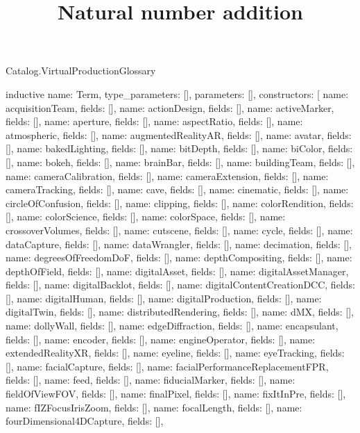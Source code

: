 \begin{lexlean}{Catalog.VirtualProductionGlossary}
\title{Natural number addition}
\begin{semanticmodule}
inductive{
  name: Term,
  type_parameters: [],
  parameters: [],
  constructors: [
    {name: acquisitionTeam, fields: []},
    {name: actionDesign, fields: []},
    {name: activeMarker, fields: []},
    {name: aperture, fields: []},
    {name: aspectRatio, fields: []},
    {name: atmospheric, fields: []},
    {name: augmentedRealityAR, fields: []},
    {name: avatar, fields: []},
    {name: bakedLighting, fields: []},
    {name: bitDepth, fields: []},
    {name: biColor, fields: []},
    {name: bokeh, fields: []},
    {name: brainBar, fields: []},
    {name: buildingTeam, fields: []},
    {name: cameraCalibration, fields: []},
    {name: cameraExtension, fields: []},
    {name: cameraTracking, fields: []},
    {name: cave, fields: []},
    {name: cinematic, fields: []},
    {name: circleOfConfusion, fields: []},
    {name: clipping, fields: []},
    {name: colorRendition, fields: []},
    {name: colorScience, fields: []},
    {name: colorSpace, fields: []},
    {name: crossoverVolumes, fields: []},
    {name: cutscene, fields: []},
    {name: cycle, fields: []},
    {name: dataCapture, fields: []},
    {name: dataWrangler, fields: []},
    {name: decimation, fields: []},
    {name: degreesOfFreedomDoF, fields: []},
    {name: depthCompositing, fields: []},
    {name: depthOfField, fields: []},
    {name: digitalAsset, fields: []},
    {name: digitalAssetManager, fields: []},
    {name: digitalBacklot, fields: []},
    {name: digitalContentCreationDCC, fields: []},
    {name: digitalHuman, fields: []},
    {name: digitalProduction, fields: []},
    {name: digitalTwin, fields: []},
    {name: distributedRendering, fields: []},
    {name: dMX, fields: []},
    {name: dollyWall, fields: []},
    {name: edgeDiffraction, fields: []},
    {name: encapsulant, fields: []},
    {name: encoder, fields: []},
    {name: engineOperator, fields: []},
    {name: extendedRealityXR, fields: []},
    {name: eyeline, fields: []},
    {name: eyeTracking, fields: []},
    {name: facialCapture, fields: []},
    {name: facialPerformanceReplacementFPR, fields: []},
    {name: feed, fields: []},
    {name: fiducialMarker, fields: []},
    {name: fieldOfViewFOV, fields: []},
    {name: finalPixel, fields: []},
    {name: fixItInPre, fields: []},
    {name: fIZFocusIrisZoom, fields: []},
    {name: focalLength, fields: []},
    {name: fourDimensional4DCapture, fields: []},
}
\end{semanticmodule}
\end{lexlean}
